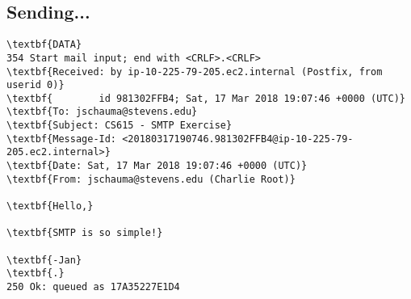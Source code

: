 \documentclass[xga]{xdvislides}
\begin{document}
\subsection{Sending...}
\begin{Verbatim}
\textbf{DATA}
354 Start mail input; end with <CRLF>.<CRLF>
\textbf{Received: by ip-10-225-79-205.ec2.internal (Postfix, from userid 0)}
\textbf{        id 981302FFB4; Sat, 17 Mar 2018 19:07:46 +0000 (UTC)}
\textbf{To: jschauma@stevens.edu}
\textbf{Subject: CS615 - SMTP Exercise}
\textbf{Message-Id: <20180317190746.981302FFB4@ip-10-225-79-205.ec2.internal>}
\textbf{Date: Sat, 17 Mar 2018 19:07:46 +0000 (UTC)}
\textbf{From: jschauma@stevens.edu (Charlie Root)}

\textbf{Hello,}

\textbf{SMTP is so simple!}

\textbf{-Jan}
\textbf{.}
250 Ok: queued as 17A35227E1D4
\end{Verbatim}
\end{document}
